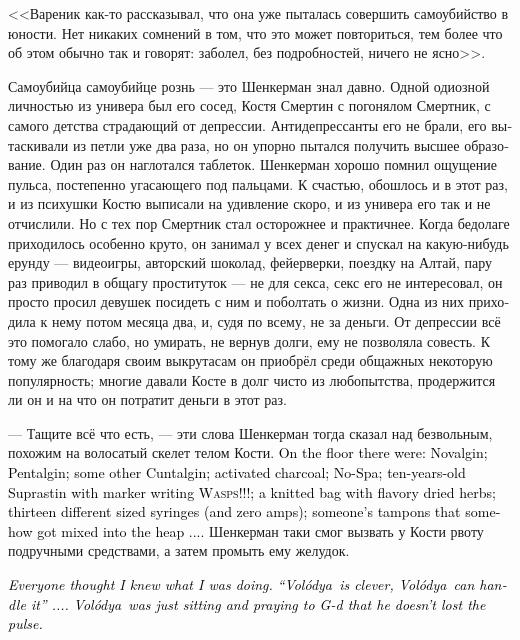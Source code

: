 \documentclass[a5paper,12pt,fleqn]{extbook}\usepackage{cooltooltips}\usepackage{polyglossia}\setdefaultlanguage[babelshorthands=true]{russian}\setotherlanguage{english}\defaultfontfeatures{Ligatures=TeX,Mapping=tex-text} \usepackage{xcolor}\definecolor{lightgray}{HTML}{bbbbbb}\color{lightgray}\newcommand{\ml}[3]{\textenglish{\textcolor{black}{#3}}}
\newcommand{\Volodya}{Vol\'odya}
\begin{document}
<<Вареник как-то рассказывал, что она уже пыталась совершить самоубийство в юности.
Нет никаких сомнений в том, что это может повториться, тем более что об этом обычно так и говорят: заболел, без подробностей, ничего не ясно>>.

Самоубийца самоубийце рознь --- это Шенкерман знал давно.
Одной одиозной личностью из универа был его сосед, Костя Смертин с погонялом Смертник, с самого детства страдающий от депрессии.
Антидепрессанты его не брали, его вытаскивали из петли уже два раза, но он упорно пытался получить высшее образование.
Один раз он наглотался таблеток.
Шенкерман хорошо помнил ощущение пульса, постепенно угасающего под пальцами.
К счастью, обошлось и в этот раз, и из психушки Костю выписали на удивление скоро, и из универа его так и не отчислили.
Но с тех пор Смертник стал осторожнее и практичнее.
Когда бедолаге приходилось особенно круто, он занимал у всех денег и спускал на какую-нибудь ерунду --- видеоигры, авторский шоколад, фейерверки, поездку на Алтай, пару раз приводил в общагу проституток --- не для секса, секс его не интересовал, он просто просил девушек посидеть с ним и поболтать о жизни.
Одна из них приходила к нему потом месяца два, и, судя по всему, не за деньги.
От депрессии всё это помогало слабо, но умирать, не вернув долги, ему не позволяла совесть.
К тому же благодаря своим выкрутасам он приобрёл среди общажных некоторую популярность;
многие давали Косте в долг чисто из любопытства, продержится ли он и на что он потратит деньги в этот раз.

--- Тащите всё что есть, --- эти слова Шенкерман тогда сказал над безвольным, похожим на волосатый скелет телом Кости.
\ml{$0$}
{На пол посыпались таблетки анальгина, пенталгина, ещё какого-то хуелгина, активированный уголь, ношпа, супрастин десятилетней давности с надписью маркером <<ОСЫ!!!>>, вязаный мешочек с пахучей сушёной травой, тринадцать разнокалиберных шприцов (и ни одной ампулы), чьи-то случайно затесавшиеся тампоны...}
{On the floor there were: Novalgin; Pentalgin; some other Cuntalgin; activated charcoal; No-Spa; ten-years-old Suprastin with marker writing \textsc{Wasps!!!}; a knitted bag with flavory dried herbs; thirteen different sized syringes (and zero amps); someone's tampons that somehow got mixed into the heap ....}
Шенкерман таки смог вызвать у Кости рвоту подручными средствами, а затем промыть ему желудок.

\ml{$0$}
{<<Все думали, что я знаю, что делаю, что у меня всё под контролем.}
{\textit{Everyone thought I knew what I was doing.}}
\ml{$0$}
{,,Володя умный, Володя разберётся``...}
{\textit{``\Volodya\ is clever, \Volodya\ can handle it'' ....}}
\ml{$0$}
{А Володя просто сидел и молился Б-гу, чтобы пульс не пропал>>.}
{\textit{\Volodya\ was just sitting and praying to G-d that he doesn't lost the pulse.}}
\end{document}

